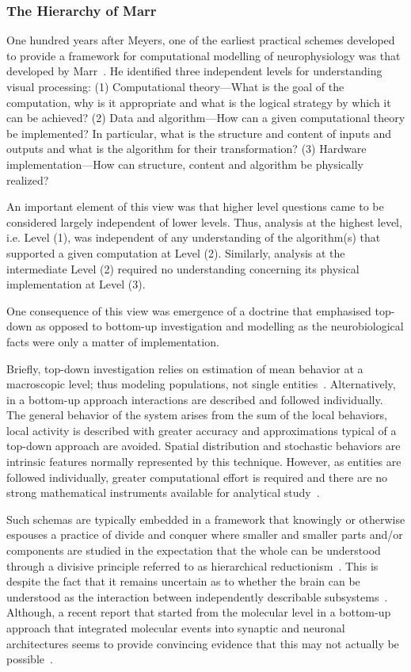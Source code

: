 \documentclass[10pt,letterpaper]{article}
\begin{document}
\subsubsection*{The Hierarchy of Marr}

One hundred years after Meyers, one of the earliest practical schemes developed to provide a framework for computational modelling of neurophysiology was that developed by Marr~\cite{Marr:1982fk}. He identified three independent levels for understanding visual processing: (1) Computational theory---What is the goal of the computation, why is it appropriate and what is the logical strategy by which it can be achieved? (2) Data and algorithm---How can a given computational theory be implemented? In particular, what is the structure and content of inputs and outputs and what is the algorithm for their transformation? (3) Hardware implementation---How can structure, content and algorithm be physically realized?

An important element of this view was that higher level questions came to be considered largely independent of lower levels. Thus, analysis at the highest level, i.e. Level (1), was independent of any understanding of the algorithm(s) that supported a given computation at Level (2). Similarly, analysis at the intermediate Level (2) required no understanding concerning its physical implementation at Level (3).

One consequence of this view was emergence of a doctrine that emphasised top-down as opposed to bottom-up investigation and modelling as the neurobiological facts were only a matter of implementation.

Briefly, top-down investigation relies on estimation of mean behavior at a macroscopic level; thus modeling populations, not single entities~\cite{chiacchio14}.  Alternatively, in a bottom-up approach interactions are described and followed individually. The general behavior of the system arises from the sum of the local behaviors, local activity is described with greater accuracy and approximations typical of a top-down approach are avoided.  Spatial distribution and stochastic behaviors are intrinsic features normally represented by this technique. However, as entities are followed individually, greater computational effort is required and there are no strong mathematical instruments available for analytical study~\cite{chiacchio14}.

Such schemas are typically embedded in a framework that knowingly or otherwise espouses a practice of divide and conquer where smaller and smaller parts and/or components are studied in the expectation that the whole can be understood through a divisive principle referred to as hierarchical reductionism~\cite{dawkins06}. This is despite the fact that it remains uncertain as to whether the brain can be understood as the interaction between independently describable subsystems~\cite{djurfeldt08}. Although, a recent report that started from the molecular level in a bottom-up approach that integrated molecular events into synaptic and neuronal architectures seems to provide convincing evidence that this may not actually be possible~\cite{bouteiller11}.
\end{document}
